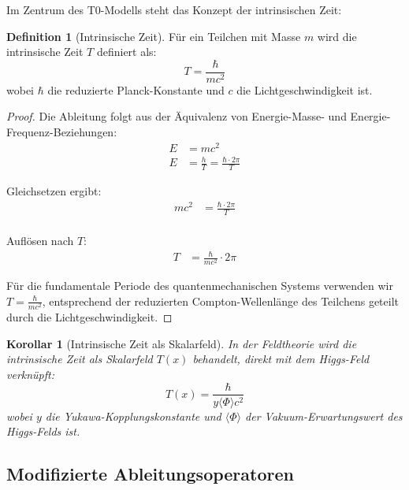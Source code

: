 \documentclass[a4paper,12pt]{article}
\newtheorem{corollary}[theorem]{Korollar}
\theoremstyle{definition}
\newtheorem{definition}{Definition}[theorem]
\theoremstyle{remark}
\begin{document}
	Im Zentrum des T0-Modells steht das Konzept der intrinsischen Zeit:
	
	\begin{definition}[Intrinsische Zeit]
		Für ein Teilchen mit Masse \(m\) wird die intrinsische Zeit \(T\) definiert als:
		\begin{equation}
			T = \frac{\hbar}{mc^2}
		\end{equation}
		wobei \(\hbar\) die reduzierte Planck-Konstante und \(c\) die Lichtgeschwindigkeit ist.
	\end{definition}
	
	\begin{proof}
		Die Ableitung folgt aus der Äquivalenz von Energie-Masse- und Energie-Frequenz-Beziehungen:
		\begin{align}
			E &= mc^2 \\
			E &= \frac{h}{T} = \frac{\hbar \cdot 2\pi}{T}
		\end{align}
		
		Gleichsetzen ergibt:
		\begin{align}
			mc^2 &= \frac{\hbar \cdot 2\pi}{T} \\
		\end{align}
		
		Auflösen nach \(T\):
		\begin{align}
			T &= \frac{\hbar}{mc^2} \cdot 2\pi
		\end{align}
		
		Für die fundamentale Periode des quantenmechanischen Systems verwenden wir \(T = \frac{\hbar}{mc^2}\), entsprechend der reduzierten Compton-Wellenlänge des Teilchens geteilt durch die Lichtgeschwindigkeit.
	\end{proof}
	
	\begin{corollary}[Intrinsische Zeit als Skalarfeld]
		In der Feldtheorie wird die intrinsische Zeit als Skalarfeld \(T(x)\) behandelt, direkt mit dem Higgs-Feld verknüpft:
		\begin{equation}
			T(x) = \frac{\hbar}{y\langle\Phi\rangle c^2}
		\end{equation}
		wobei \(y\) die Yukawa-Kopplungskonstante und \(\langle\Phi\rangle\) der Vakuum-Erwartungswert des Higgs-Felds ist.
	\end{corollary}
	
	\subsection{Modifizierte Ableitungsoperatoren}
	
\end{document}
